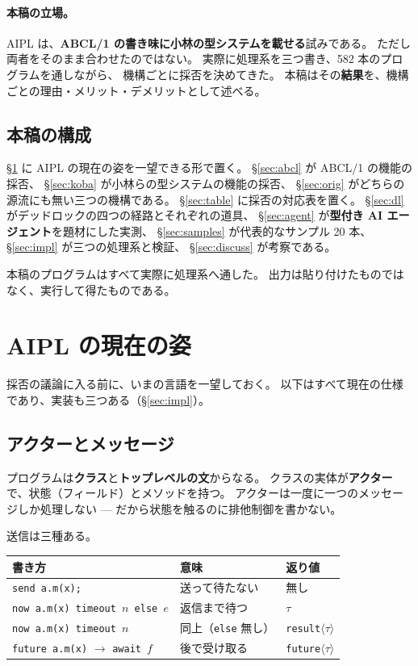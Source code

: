 \documentclass[11pt,a4paper]{ltjsarticle}
\theoremstyle{definition}
\theoremstyle{remark}
\begin{document}
\paragraph{本稿の立場。}
AIPL は、\textbf{ABCL/1 の書き味に小林の型システムを載せる}試みである。
ただし両者をそのまま合わせたのではない。
実際に処理系を三つ書き、582 本のプログラムを通しながら、
機構ごとに採否を決めてきた。
本稿はその\textbf{結果}を、機構ごとの理由・メリット・デメリットとして述べる。

\subsection{本稿の構成}

\S\ref{sec:spec} に AIPL の現在の姿を一望できる形で置く。
\S\ref{sec:abcl} が ABCL/1 の機能の採否、
\S\ref{sec:koba} が小林らの型システムの機能の採否、
\S\ref{sec:orig} がどちらの源流にも無い三つの機構である。
\S\ref{sec:table} に採否の対応表を置く。
\S\ref{sec:dl} がデッドロックの四つの経路とそれぞれの道具、
\S\ref{sec:agent} が\textbf{型付き AI エージェント}を題材にした実測、
\S\ref{sec:samples} が代表的なサンプル 20 本、
\S\ref{sec:impl} が三つの処理系と検証、
\S\ref{sec:discuss} が考察である。

本稿のプログラムはすべて実際に処理系へ通した。
出力は貼り付けたものではなく、実行して得たものである。

\section{AIPL の現在の姿}
\label{sec:spec}

採否の議論に入る前に、いまの言語を一望しておく。
以下はすべて現在の仕様であり、実装も三つある（\S\ref{sec:impl}）。

\subsection{アクターとメッセージ}

プログラムは\textbf{クラス}と\textbf{トップレベルの文}からなる。
クラスの実体が\textbf{アクター}で、状態（フィールド）とメソッドを持つ。
アクターは一度に一つのメッセージしか処理しない ---
だから状態を触るのに排他制御を書かない。

送信は三種ある。

\begin{center}
\begin{tabular}{lll}
\toprule
書き方 & 意味 & 返り値 \\
\midrule
\texttt{send a.m(x);} & 送って待たない & 無し \\
\texttt{now a.m(x) timeout $n$ else $e$} & 返信まで待つ & $\tau$ \\
\texttt{now a.m(x) timeout $n$} & 同上（\texttt{else} 無し） & \texttt{result}$\langle\tau\rangle$ \\
\texttt{future a.m(x)} $\to$ \texttt{await $f$} & 後で受け取る & \texttt{future}$\langle\tau\rangle$ \\
\bottomrule
\end{tabular}
\end{center}
\end{document}
